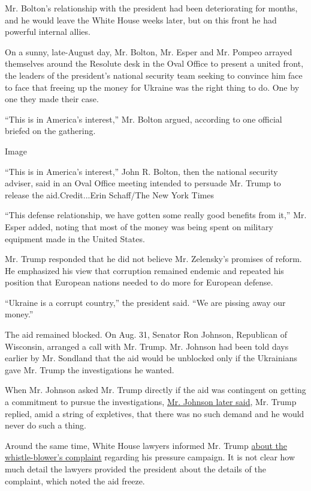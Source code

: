 Mr. Bolton's relationship with the president had been deteriorating for
months, and he would leave the White House weeks later, but on this
front he had powerful internal allies.

On a sunny, late-August day, Mr. Bolton, Mr. Esper and Mr. Pompeo
arrayed themselves around the Resolute desk in the Oval Office to
present a united front, the leaders of the president's national security
team seeking to convince him face to face that freeing up the money for
Ukraine was the right thing to do. One by one they made their case.

``This is in America's interest,'' Mr. Bolton argued, according to one
official briefed on the gathering.

Image

``This is in America's interest,'' John R. Bolton, then the national
security adviser, said in an Oval Office meeting intended to persuade
Mr. Trump to release the aid.Credit...Erin Schaff/The New York Times

``This defense relationship, we have gotten some really good benefits
from it,'' Mr. Esper added, noting that most of the money was being
spent on military equipment made in the United States.

Mr. Trump responded that he did not believe Mr. Zelensky's promises of
reform. He emphasized his view that corruption remained endemic and
repeated his position that European nations needed to do more for
European defense.

``Ukraine is a corrupt country,'' the president said. ``We are pissing
away our money.''

The aid remained blocked. On Aug. 31, Senator Ron Johnson, Republican of
Wisconsin, arranged a call with Mr. Trump. Mr. Johnson had been told
days earlier by Mr. Sondland that the aid would be unblocked only if the
Ukrainians gave Mr. Trump the investigations he wanted.

When Mr. Johnson asked Mr. Trump directly if the aid was contingent on
getting a commitment to pursue the investigations,
\href{https://www.ronjohnson.senate.gov/public/_cache/files/e0b73c19-9370-42e6-88b1-b2458eaeeecd/johnson-to-jordan-nunes.pdf}{Mr.
Johnson later said}, Mr. Trump replied, amid a string of expletives,
that there was no such demand and he would never do such a thing.

Around the same time, White House lawyers informed Mr. Trump
\href{https://www.nytimes.com/2019/11/26/us/politics/trump-whistle-blower-complaint-ukraine.html}{about
the whistle-blower's complaint} regarding his pressure campaign. It is
not clear how much detail the lawyers provided the president about the
details of the complaint, which noted the aid freeze.

